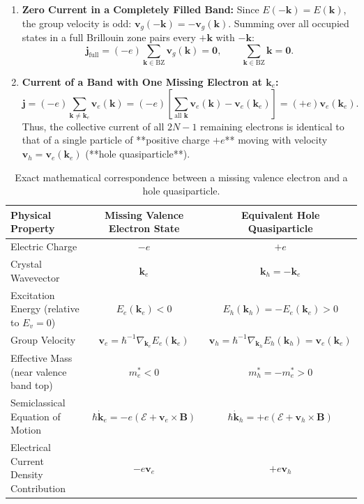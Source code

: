 \documentclass[11pt,a4paper]{article}
\newcommand{\vb}[1]{\mathbf{#1}}
\newcommand{\hb}{\hbar}
\newcommand{\kk}{\mathbf{k}}
\newcommand{\BZ}{\text{BZ}}
\begin{document}
\begin{enumerate}
    \item \textbf{Zero Current in a Completely Filled Band:} Since $E(-\kk) = E(\kk)$, the group velocity is odd: $\vb{v}_g(-\kk) = -\vb{v}_g(\kk)$. Summing over all occupied states in a full Brillouin zone pairs every $+\kk$ with $-\kk$:
    \begin{equation}
        \vb{j}_{\mathrm{full}} = (-e)\sum_{\kk\in\BZ}\vb{v}_g(\kk) = \vb{0}, \qquad \sum_{\kk\in\BZ}\kk = \vb{0}.
    \end{equation}
    \item \textbf{Current of a Band with One Missing Electron at $\kk_e$:}
    \begin{equation}
        \vb{j} = (-e)\sum_{\kk\neq\kk_e}\vb{v}_e(\kk) = (-e)\left[\sum_{\text{all }\kk}\vb{v}_e(\kk) - \vb{v}_e(\kk_e)\right] = (+e)\vb{v}_e(\kk_e).
    \end{equation}
    Thus, the collective current of all $2N-1$ remaining electrons is identical to that of a single particle of **positive charge $+e$** moving with velocity $\vb{v}_h = \vb{v}_e(\kk_e)$ (**hole quasiparticle**).
\end{enumerate}

\begin{table}[htbp]
\centering
\renewcommand{\arraystretch}{1.2}
\begin{tabular}{lcc}
\toprule
\textbf{Physical Property} & \textbf{Missing Valence Electron State} & \textbf{Equivalent Hole Quasiparticle} \\
\midrule
Electric Charge & $-e$ & $+e$ \\
Crystal Wavevector & $\kk_e$ & $\kk_h = -\kk_e$ \\
Excitation Energy (relative to $E_v=0$) & $E_e(\kk_e) < 0$ & $E_h(\kk_h) = -E_e(\kk_e) > 0$ \\
Group Velocity & $\vb{v}_e = \hb^{-1}\nabla_{\kk_e}E_e(\kk_e)$ & $\vb{v}_h = \hb^{-1}\nabla_{\kk_h}E_h(\kk_h) = \vb{v}_e(\kk_e)$ \\
Effective Mass (near valence band top) & $m_e^* < 0$ & $m_h^* = -m_e^* > 0$ \\
Semiclassical Equation of Motion & $\hb\dot{\kk}_e = -e(\bm{\mathcal{E}} + \vb{v}_e\times\vb{B})$ & $\hb\dot{\kk}_h = +e(\bm{\mathcal{E}} + \vb{v}_h\times\vb{B})$ \\
Electrical Current Density Contribution & $-e\vb{v}_e$ & $+e\vb{v}_h$ \\
\bottomrule
\end{tabular}
\caption{Exact mathematical correspondence between a missing valence electron and a hole quasiparticle.}
\label{tab:hole_mapping_master}
\end{table}
\end{document}
